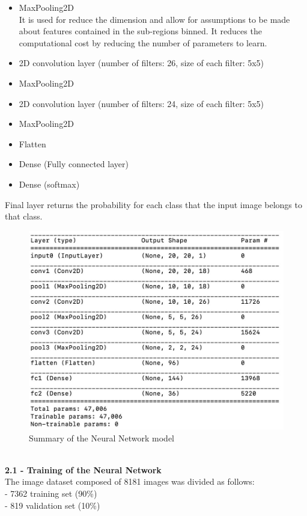 \documentclass[11pt]{article}
\begin{document}
\begin{titlepage}
{\begin{itemize}
\\ Spatial convolution over images
\item MaxPooling2D \\It is used for reduce the dimension and allow for assumptions to be made about features contained in the sub-regions binned. It reduces the computational cost by reducing the number of parameters to learn.
\item 2D convolution layer (number of filters: 26, size of each filter: 5x5)
\item MaxPooling2D 
\item 2D convolution layer (number of filters: 24, size of each filter: 5x5)
\item MaxPooling2D 
\item Flatten
\item Dense (Fully connected layer)
\item Dense (softmax)
\end{itemize}
Final layer returns the probability for each class that the input image belongs to that class.
\begin{figure}[htbp]
\centering
\includegraphics[totalheight=0.658\textwidth]{rete.jpg}
\caption{Summary of the Neural Network model}
\label{}
\end{figure}
\\\textbf{\large{2.1 - Training of the Neural Network}}
\\[1mm]
The image dataset composed of 8181 images was divided as follows:
\\ - 7362 training set (90\%)
\\ - 819 validation set (10\%)
}
\end{titlepage}
\end{document}
